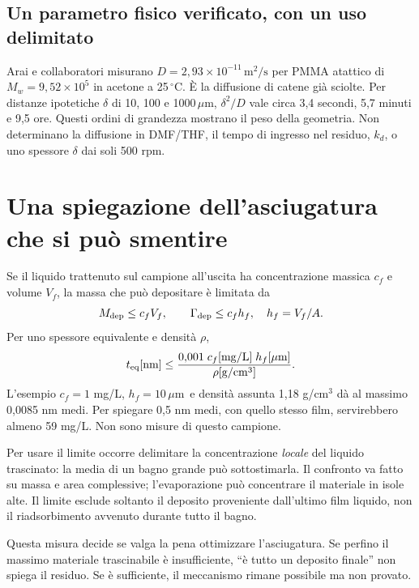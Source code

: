 \documentclass[11pt,reqno]{amsart}
\numberwithin{equation}{section}
\newcommand{\degC}{\ensuremath{^{\circ}\mathrm{C}}}
\newcommand{\um}{\ensuremath{\mu\mathrm{m}}}
\begin{document}
\subsection{Un parametro fisico verificato, con un uso delimitato}
Arai e collaboratori \cite{Arai1996} misurano
$D=2{,}93\times10^{-11}\,\mathrm{m^2/s}$ per PMMA atattico
di $M_w=9{,}52\times10^5$ in acetone a 25\,\degC.
\`E la diffusione di catene gi\`a sciolte. Per distanze
ipotetiche $\delta$ di 10, 100 e 1000\,\um,
$\delta^2/D$ vale circa 3,4 secondi, 5,7 minuti e 9,5 ore.
Questi ordini di grandezza mostrano il peso della geometria.
Non determinano la diffusione in DMF/THF, il tempo di ingresso
nel residuo, $k_d$, o uno spessore $\delta$ dai soli 500 rpm.

\section{Una spiegazione dell'asciugatura che si pu\`o smentire}

Se il liquido trattenuto sul campione all'uscita ha concentrazione
massica $c_f$ e volume $V_f$, la massa che pu\`o depositare \`e
limitata da
\begin{equation}\label{eq:mass-bound}
 M_{\rm dep}\le c_fV_f,\qquad
 \Gamma_{\rm dep}\le c_fh_f,\quad h_f=V_f/A.
\end{equation}
Per uno spessore equivalente e densit\`a $\rho$,
\begin{equation}\label{eq:units}
 t_{\rm eq}[\mathrm{nm}]\le
 \frac{0{,}001\;c_f[\mathrm{mg/L}]\;h_f[\mu\mathrm m]}
 {\rho[\mathrm{g/cm^3}]}.
\end{equation}
L'esempio $c_f=1$ mg/L, $h_f=10$\,\um\ e densit\`a
assunta 1,18 g/cm$^3$ d\`a al massimo 0,0085 nm medi.
Per spiegare 0,5 nm medi, con quello stesso film, servirebbero
almeno 59 mg/L. Non sono misure di questo campione.

Per usare il limite occorre delimitare la concentrazione
\emph{locale} del liquido trascinato: la media di un bagno grande
pu\`o sottostimarla. Il confronto va fatto su massa e area
complessive; l'evaporazione pu\`o concentrare il materiale in
isole alte. Il limite esclude soltanto il deposito proveniente
dall'ultimo film liquido, non il riadsorbimento avvenuto durante
tutto il bagno.

Questa misura decide se valga la pena ottimizzare l'asciugatura.
Se perfino il massimo materiale trascinabile \`e insufficiente,
``\`e tutto un deposito finale'' non spiega il residuo.
Se \`e sufficiente, il meccanismo rimane possibile ma non provato.
\end{document}
